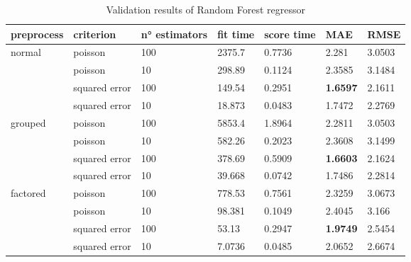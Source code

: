 \begin{table}[H]
    \centering
    \begin{tabular}{lll|llll}
    \toprule
    \textbf{preprocess} & \textbf{criterion} & \textbf{n° estimators} & \textbf{fit time} & \textbf{score time} & \textbf{MAE} & \textbf{RMSE} \\ \midrule
    \multirow{4}{*}{normal}     & poisson       & 100 & 2375.7 & 0.7736  & 2.281           & 3.0503 \\
                                & poisson       & 10  & 298.89 & 0.1124  & 2.3585          & 3.1484 \\
                                & squared error & 100 & 149.54 & 0.2951  & \textbf{1.6597} & 2.1611 \\
                                & squared error & 10  & 18.873 & 0.0483  & 1.7472          & 2.2769 \\
                                \midrule
    \multirow{4}{*}{grouped}    & poisson       & 100 & 5853.4 & 1.8964  & 2.2811          & 3.0503 \\
                                & poisson       & 10  & 582.26 & 0.2023  & 2.3608          & 3.1499 \\
                                & squared error & 100 & 378.69 & 0.5909  & \textbf{1.6603} & 2.1624 \\
                                & squared error & 10  & 39.668 & 0.0742  & 1.7486          & 2.2814 \\
                                \midrule
    \multirow{4}{*}{factored}   & poisson       & 100 & 778.53 & 0.7561  & 2.3259          & 3.0673 \\
                                & poisson       & 10  & 98.381 & 0.1049  & 2.4045          & 3.166  \\
                                & squared error & 100 & 53.13  & 0.2947  & \textbf{1.9749} & 2.5454 \\
                                & squared error & 10  & 7.0736 & 0.0485  & 2.0652          & 2.6674 \\
    \bottomrule
    \end{tabular}
    \caption{Validation results of Random Forest regressor}
    \label{tab:val_rf}
\end{table}